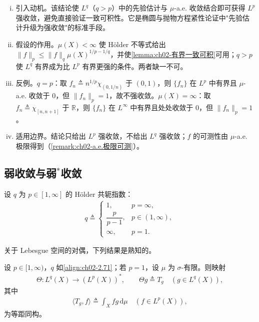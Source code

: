 \documentclass[../../main.tex]{subfiles}%
\begin{document}
\begin{remark}\label{remark:ch02-高Lp强收敛}
\begin{enumerate}[(i)]
\item 引入动机。该结论使 $L^q$（$q>p$）中的先验估计与 $\mu$-a.e. 收敛结合即可获得 $L^p$ 强收敛，避免直接验证一致可积性。它是椭圆与抛物方程紧性论证中"先验估计升级为强收敛"的标准手段。
\item 假设的作用。$\mu(X)<\infty$ 使 Hölder 不等式给出 $\|f\|_p\leqslant\|f\|_q\mu(X)^{1/p-1/q}$，并使\cref{lemma:ch02-有界一致可积}可用；$q>p$ 使 $L^q$ 有界成为比 $L^p$ 有界更强的条件。两者缺一不可。
\item 反例。$q=p$：取 $f_n\triangleq n^{1/p}\chi_{(0,1/n)}$ 于 $(0,1)$，则 $\{f_n\}$ 在 $L^p$ 中有界且 $\mu$-a.e. 收敛于 $0$，但 $\|f_n\|_p=1$，故不强收敛。$\mu(X)=\infty$：取 $f_n\triangleq\chi_{[n,n+1]}$ 于 $\mathbb R$，则 $\{f_n\}$ 在 $L^\infty$ 中有界且处处收敛于 $0$，但 $\|f_n\|_p=1$。
\item 适用边界。结论只给出 $L^p$ 强收敛，不给出 $L^q$ 强收敛；$f$ 的可测性由 $\mu$-a.e. 极限得到（\cref{remark:ch02-a.e.极限可测}）。
\end{enumerate}
\end{remark}

\subsection{弱收敛与弱$^*$收敛}\label{subsection:ch02-弱收敛}

设 $q$ 为 $p\in[1,\infty]$ 的 H\"older 共轭指数：
\begin{align}
q\triangleq 
\begin{cases}
1, & p=\infty,\\
\dfrac{p}{p-1}, & p\in(1,\infty),\\
\infty, & p=1.
\end{cases} 
\label{align:ch02-2.71}
\end{align}

关于 Lebesgue 空间的对偶，下列结果是熟知的。

\begin{theorem}[Riesz 表示]\label{theorem:ch02-Lp对偶}
设 $p\in[1,\infty)$，$q$ 如\eqref{align:ch02-2.71}；若 $p=1$，设 $\mu$ 为 $\sigma$-有限。则映射
\begin{align*}
\Theta:L^q(X)\to(L^p(X))^*,\qquad\Theta g\triangleq T_g\quad(g\in L^q(X)),
\end{align*}
其中
\begin{align*}
\langle T_g,f\rangle\triangleq \int_X fg\,\mathrm{d}\mu\quad(f\in L^p(X)),
\end{align*}
为等距同构。
\end{theorem}
\end{document}
